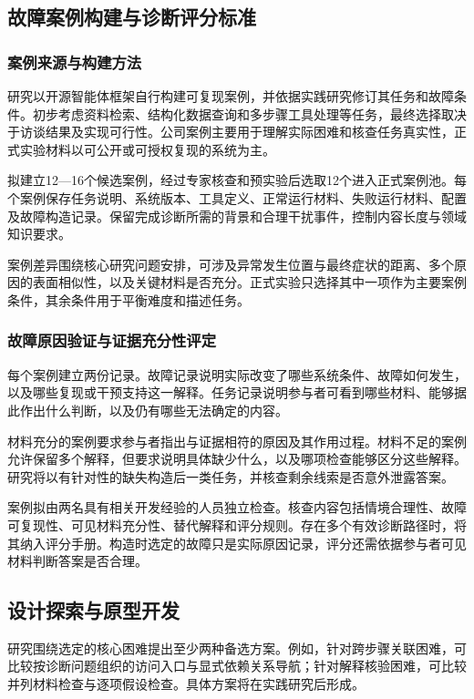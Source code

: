 \subsection{故障案例构建与诊断评分标准}

\subsubsection{案例来源与构建方法}

研究以开源智能体框架自行构建可复现案例，并依据实践研究修订其任务和故障条件。初步考虑资料检索、结构化数据查询和多步骤工具处理等任务，最终选择取决于访谈结果及实现可行性。公司案例主要用于理解实际困难和核查任务真实性，正式实验材料以可公开或可授权复现的系统为主。

拟建立12—16个候选案例，经过专家核查和预实验后选取12个进入正式案例池。每个案例保存任务说明、系统版本、工具定义、正常运行材料、失败运行材料、配置及故障构造记录。保留完成诊断所需的背景和合理干扰事件，控制内容长度与领域知识要求。

案例差异围绕核心研究问题安排，可涉及异常发生位置与最终症状的距离、多个原因的表面相似性，以及关键材料是否充分。正式实验只选择其中一项作为主要案例条件，其余条件用于平衡难度和描述任务。

\subsubsection{故障原因验证与证据充分性评定}

每个案例建立两份记录。故障记录说明实际改变了哪些系统条件、故障如何发生，以及哪些复现或干预支持这一解释。任务记录说明参与者可看到哪些材料、能够据此作出什么判断，以及仍有哪些无法确定的内容。

材料充分的案例要求参与者指出与证据相符的原因及其作用过程。材料不足的案例允许保留多个解释，但要求说明具体缺少什么，以及哪项检查能够区分这些解释。研究将以有针对性的缺失构造后一类任务，并核查剩余线索是否意外泄露答案。

案例拟由两名具有相关开发经验的人员独立检查。核查内容包括情境合理性、故障可复现性、可见材料充分性、替代解释和评分规则。存在多个有效诊断路径时，将其纳入评分手册。构造时选定的故障只是实际原因记录，评分还需依据参与者可见材料判断答案是否合理。

\subsection{设计探索与原型开发}

研究围绕选定的核心困难提出至少两种备选方案。例如，针对跨步骤关联困难，可比较按诊断问题组织的访问入口与显式依赖关系导航；针对解释核验困难，可比较并列材料检查与逐项假设检查。具体方案将在实践研究后形成。

